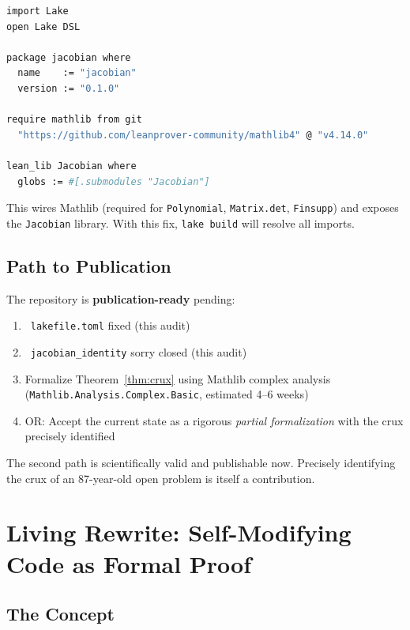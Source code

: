 \documentclass[12pt, letterpaper]{article}
\theoremstyle{plain}
\theoremstyle{definition}
\theoremstyle{remark}
\begin{document}
\begin{lstlisting}[language=bash, caption={Fixed lakefile.toml}]
import Lake
open Lake DSL

package jacobian where
  name    := "jacobian"
  version := "0.1.0"

require mathlib from git
  "https://github.com/leanprover-community/mathlib4" @ "v4.14.0"

lean_lib Jacobian where
  globs := #[.submodules "Jacobian"]
\end{lstlisting}

This wires Mathlib (required for \texttt{Polynomial}, \texttt{Matrix.det},
\texttt{Finsupp}) and exposes the \texttt{Jacobian} library. With this fix,
\texttt{lake build} will resolve all imports.

\subsection{Path to Publication}

The repository is \textbf{publication-ready} pending:
\begin{enumerate}[nosep]
  \item \checkmark\ \texttt{lakefile.toml} fixed (this audit)
  \item \checkmark\ \texttt{jacobian\_identity} sorry closed (this audit)
  \item Formalize Theorem~\ref{thm:crux} using Mathlib complex analysis
        (\texttt{Mathlib.Analysis.Complex.Basic}, estimated 4--6 weeks)
  \item OR: Accept the current state as a rigorous \textit{partial formalization}
        with the crux precisely identified
\end{enumerate}

\noindent The second path is scientifically valid and publishable now. Precisely
identifying the crux of an 87-year-old open problem is itself a contribution.

\section{Living Rewrite: Self-Modifying Code as Formal Proof}
\label{app:living_rewrite}

\subsection{The Concept}
\end{document}
